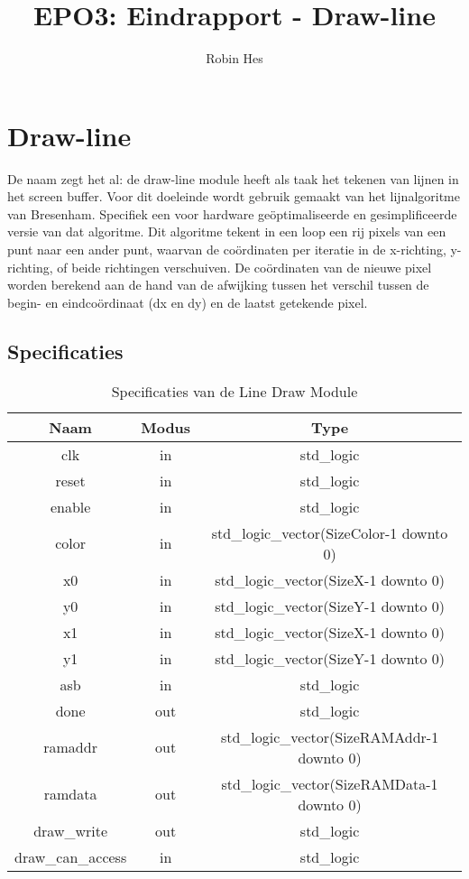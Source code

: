 \documentclass{scrartcl} %
\author{Robin Hes}
\title{EPO3: Eindrapport - Draw-line}
\begin{document}
\section{Draw-line}
\label{sec:draw-line}
De naam zegt het al: de draw-line module heeft als taak het tekenen van lijnen in het screen buffer. Voor dit doeleinde wordt gebruik gemaakt van het lijnalgoritme van Bresenham. Specifiek een voor hardware geöptimaliseerde en gesimplificeerde versie van dat algoritme. \cite{line-alg} Dit algoritme tekent in een loop een rij pixels van een punt naar een ander punt, waarvan de coördinaten per iteratie in de x-richting, y-richting, of beide richtingen verschuiven. De coördinaten van de nieuwe pixel worden berekend aan de hand van de afwijking tussen het verschil tussen de begin- en eindcoördinaat (dx en dy) en de laatst getekende pixel.

\subsection{Specificaties}
\begin{table}[H]
\centering
\caption{Specificaties van de Line Draw Module}
\label{tab:spec-line-draw}
	\begin{tabular}{c c c}
		\hline\hline
	 	Naam & Modus & Type\\
	 	\hline	
		clk & in & std\_logic \\
		reset & in & std\_logic \\
		enable& in & std\_logic \\
		color & in & std\_logic\_vector(SizeColor-1 downto 0) \\
		x0 & in & std\_logic\_vector(SizeX-1 downto 0) \\
		y0 & in & std\_logic\_vector(SizeY-1 downto 0) \\
		x1 & in & std\_logic\_vector(SizeX-1 downto 0) \\
		y1 & in & std\_logic\_vector(SizeY-1 downto 0) \\
		asb & in & std\_logic \\
		done & out & std\_logic \\
		ramaddr &out & std\_logic\_vector(SizeRAMAddr-1 downto 0) \\
		ramdata &out & std\_logic\_vector(SizeRAMData-1 downto 0) \\
		draw\_write &out & std\_logic \\
		draw\_can\_access & in & std\_logic \\
	  	\hline
	\end{tabular}
\end{table}
\end{document}
